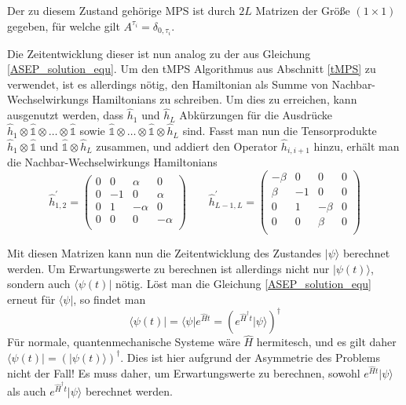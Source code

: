 \documentclass[10pt,a4paper]{report}
\begin{document}
Der zu diesem Zustand gehörige MPS ist durch $2L$ Matrizen der Größe $(1\times 1)$ gegeben, für welche gilt $A^{\tau_i}=\delta_{0,\tau_i}$. \par

Die Zeitentwicklung dieser ist nun analog zu der aus Gleichung \ref{ASEP_solution_equ}. Um den tMPS Algorithmus aus Abschnitt \ref{tMPS} zu verwendet, ist es allerdings nötig, den Hamiltonian als Summe von Nachbar-Wechselwirkungs Hamiltonians zu schreiben. Um dies zu erreichen, kann ausgenutzt werden, dass $\hat{h}_1$ und $\hat{h}_L$ Abkürzungen für die Ausdrücke $\hat{h}_1\otimes\hat{\mathbb{1}}\otimes\ldots\otimes\hat{\mathbb{1}}$ sowie $\hat{\mathbb{1}}\otimes\ldots\otimes\hat{\mathbb{1}}\otimes\hat{h}_L$ sind. Fasst man nun die Tensorprodukte $\hat{h}_1\otimes\hat{\mathbb{1}}$ und $\hat{\mathbb{1}}\otimes\hat{h}_L$ zusammen, und addiert den Operator $\hat{h}_{i,i+1}$ hinzu, erhält man die Nachbar-Wechselwirkungs Hamiltonians
\begin{equation}
\hat{h}_{1,2}^\prime=
\begin{pmatrix}
0&0&\alpha&0\\
0&-1&0&\alpha\\
0&1&-\alpha&0\\
0&0&0&-\alpha\\
\end{pmatrix}
\qquad
\hat{h}_{L-1,L}^\prime=
\begin{pmatrix}
-\beta&0&0&0\\
\beta&-1&0&0\\
0&1&-\beta&0\\
0&0&\beta&0\\
\end{pmatrix}
\end{equation} 

Mit diesen Matrizen kann nun die Zeitentwicklung des Zustandes $|\psi\rangle$ berechnet werden. Um Erwartungswerte zu berechnen ist allerdings nicht nur $|\psi(t)\rangle$, sondern auch $\langle\psi(t)|$ nötig. Löst man die Gleichung \ref{ASEP_solution_equ} erneut für $\langle\psi|$, so findet man
\begin{equation}
\langle\psi(t)|=\langle\psi|e^{\hat{H}t}=(e^{\hat{H}^\dagger t}|\psi\rangle)^\dagger
\end{equation}
Für normale, quantenmechanische Systeme wäre $\hat{H}$ hermitesch, und es gilt daher $\langle\psi(t)|=(|\psi(t)\rangle)^\dagger$. Dies ist hier aufgrund der Asymmetrie des Problems nicht der Fall! Es muss daher, um Erwartungswerte zu berechnen, sowohl $e^{\hat{H} t}|\psi\rangle$ als auch $e^{\hat{H}^\dagger t}|\psi\rangle$ berechnet werden.
\end{document}
